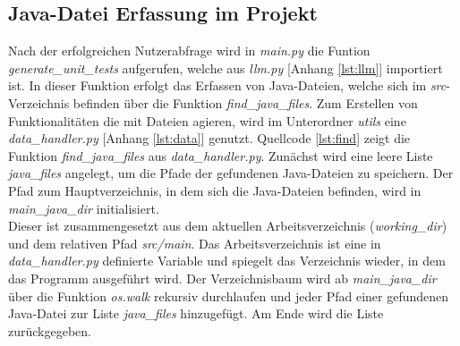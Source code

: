 \subsection{Java-Datei Erfassung im Projekt}
Nach der erfolgreichen Nutzerabfrage wird in \textit{main.py} die Funtion \textit{generate\_unit\_tests} aufgerufen, welche aus \textit{llm.py} [Anhang \ref{lst:llm}] importiert ist. In dieser Funktion erfolgt das Erfassen von Java-Dateien, welche sich im \textit{src}-Verzeichnis befinden über die Funktion \textit{find\_java\_files}. Zum Erstellen von Funktionalitäten die mit Dateien agieren, wird im Unterordner \textit{utils} eine \textit{data\_handler.py} [Anhang \ref{lst:data}] genutzt. Quellcode \ref{lst:find} zeigt die Funktion \textit{find\_java\_files} aus \textit{data\_handler.py}. Zunächst wird eine leere Liste \textit{java\_files} angelegt, um die Pfade der gefundenen Java-Dateien zu speichern. Der Pfad zum Hauptverzeichnis, in dem sich die Java-Dateien befinden, wird in \textit{main\_java\_dir} initialisiert. \\
\vspace{-.3cm}
Dieser ist zusammengesetzt aus dem aktuellen Arbeitsverzeichnis (\textit{working\_dir}) und dem relativen Pfad \textit{src/main}. Das Arbeitsverzeichnis ist eine in \textit{data\_handler.py} definierte Variable und spiegelt das Verzeichnis wieder, in dem das Programm ausgeführt wird. Der Verzeichnisbaum wird ab \textit{main\_java\_dir} über die Funktion \textit{os.walk} rekursiv durchlaufen und jeder Pfad einer gefundenen Java-Datei zur Liste \textit{java\_files} hinzugefügt. Am Ende wird die Liste zurückgegeben. 

